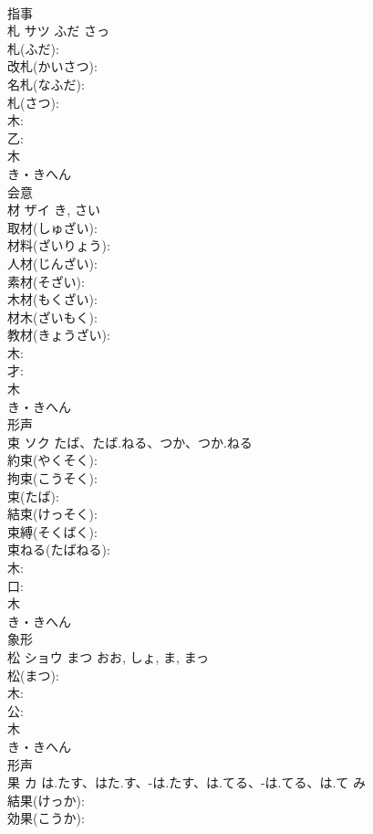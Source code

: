 \documentclass[8pt]{extreport}
\begin{document}
\begin{CJK}{UTF8}{min}
\\	指事 
\\	札	サツ	ふだ	さっ	
\\	札(ふだ): 
\\	改札(かいさつ): 
\\	名札(なふだ): 
\\	札(さつ): 
\\	木: 
\\	乙: 
\\	木	
\\	き・きへん	
\\	会意 
\\	材	ザイ		き, さい	
\\	取材(しゅざい): 
\\	材料(ざいりょう): 
\\	人材(じんざい): 
\\	素材(そざい): 
\\	木材(もくざい): 
\\	材木(ざいもく): 
\\	教材(きょうざい): 
\\	木: 
\\	才: 
\\	木	
\\	き・きへん	
\\	形声 
\\	束	ソク	たば、たば.ねる、つか、つか.ねる		
\\	約束(やくそく): 
\\	拘束(こうそく): 
\\	束(たば): 
\\	結束(けっそく): 
\\	束縛(そくばく): 
\\	束ねる(たばねる): 
\\	木: 
\\	口: 
\\	木	
\\	き・きへん	
\\	象形 
\\	松	ショウ	まつ	おお, しょ, ま, まっ	
\\	松(まつ): 
\\	木: 
\\	公: 
\\	木	
\\	き・きへん	
\\	形声 
\\	果	カ	は.たす、はた.す、-は.たす、は.てる、-は.てる、は.て	み	
\\	結果(けっか): 
\\	効果(こうか): 

\end{CJK}
\end{document}
